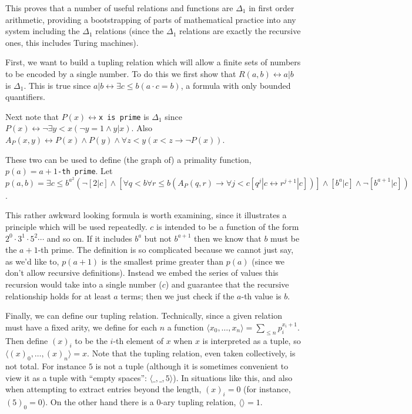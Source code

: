 \documentclass[12pt]{article}
\begin{document}
This proves that a number of useful relations and functions are $\Delta_1$ in first order arithmetic, providing a bootstrapping of parts of mathematical practice into any system including the $\Delta_1$ relations (since the $\Delta_1$ relations are exactly the recursive ones, this includes Turing machines).

First, we want to build a tupling relation which will allow a finite sets of numbers to be encoded by a single number.  To do this we first show that $R(a,b)\leftrightarrow a| b$ is $\Delta_1$.  This is true since $a| b\leftrightarrow \exists c\leq b (a\cdot c=b)$, a formula with only bounded quantifiers.

Next note that $P(x)\leftrightarrow$\texttt{x is prime} is $\Delta_1$ since $P(x)\leftrightarrow \neg\exists y<x (\neg y=1\wedge y| x)$. Also $A_P(x,y)\leftrightarrow P(x)\wedge P(y)\wedge \forall z<y(x<z\rightarrow \neg P(x))$.

These two can be used to define (the graph of) a primality function, $p(a)=a+1$\texttt{-th prime}.  Let $p(a,b)=\exists c\leq b^{a^2} (\neg[2|c]\wedge [\forall q<b\forall r\leq b (A_P(q,r)\rightarrow \forall j<c [q^j| c\leftrightarrow r^{j+1}| c])]\wedge [b^a| c]\wedge \neg[b^{a+1}|c])$.

This rather awkward looking formula is worth examining, since it illustrates a principle which will be used repeatedly.  $c$ is intended to be a function of the form $2^0\cdot 3^1\cdot 5^2\cdots$ and so on.  If it includes $b^a$ but not $b^{a+1}$ then we know that $b$ must be the $a+1$-th prime.  The definition is so complicated because we cannot just say, as we'd like to, $p(a+1)$ is the smallest prime greater than $p(a)$ (since we don't allow recursive definitions).  Instead we embed the series of values this recursion would take into a single number ($c$) and guarantee that the recursive relationship holds for at least $a$ terms; then we just check if the $a$-th value is $b$.

Finally, we can define our tupling relation.  Technically, since a given relation must have a fixed arity, we define for each $n$ a function $\langle x_0,\ldots,x_n\rangle=\sum_{\leq n} p_i^{x_i+1}$.  Then define $(x)_i$ to be the $i$-th element of $x$ when $x$ is interpreted as a tuple, so $\langle (x)_0,\ldots,(x)_n\rangle=x$.  Note that the tupling relation, even taken collectively, is not total.  For instance $5$ is not a tuple (although it is sometimes convenient to view it as a tuple with ``empty spaces'': $\langle \_,\_,5\rangle$).  In situations like this, and also when attempting to extract entries beyond the length, $(x)_i=0$ (for instance, $(5)_0=0$).  On the other hand there is a $0$-ary tupling relation, $\langle\rangle=1$.
\end{document}

